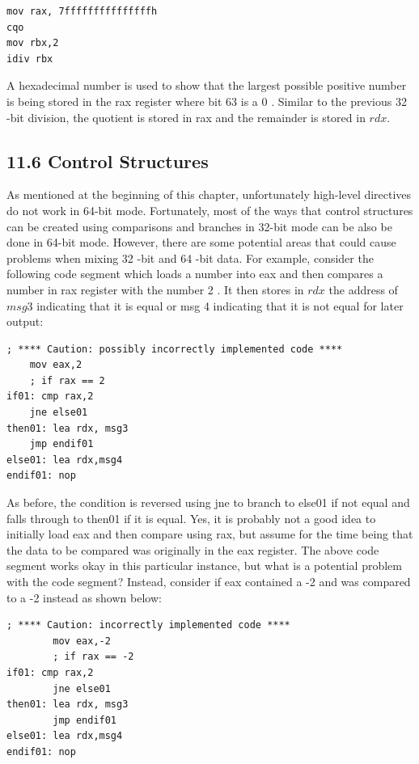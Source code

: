 \documentclass[10pt]{book}
\begin{document}
\begin{verbatim}
mov rax, 7fffffffffffffffh
cqo
mov rbx,2
idiv rbx
\end{verbatim}

A hexadecimal number is used to show that the largest possible positive number is being stored in the rax register where bit 63 is a 0 . Similar to the previous 32 -bit division, the quotient is stored in rax and the remainder is stored in $r d x$.

\subsection*{11.6 Control Structures}
As mentioned at the beginning of this chapter, unfortunately high-level directives do not work in 64-bit mode. Fortunately, most of the ways that control structures can be created using comparisons and branches in 32-bit mode can be also be done in 64-bit mode. However, there are some potential areas that could cause problems when mixing 32 -bit and 64 -bit data. For example, consider the following code segment which loads a number into eax and then compares a number in rax register with the number 2 . It then stores in $r d x$ the address of $m s g 3$ indicating that it is equal or msg 4 indicating that it is not equal for later output:

\begin{verbatim}
; **** Caution: possibly incorrectly implemented code ****
    mov eax,2
    ; if rax == 2
if01: cmp rax,2
    jne else01
then01: lea rdx, msg3
    jmp endif01
else01: lea rdx,msg4
endif01: nop
\end{verbatim}

As before, the condition is reversed using jne to branch to else01 if not equal and falls through to then01 if it is equal. Yes, it is probably not a good idea to initially load eax and then compare using rax, but assume for the time being that the data to be compared was originally in the eax register. The above code segment works okay in this particular instance, but what is a potential problem with the code segment? Instead, consider if eax contained a -2 and was compared to a -2 instead as shown below:

\begin{verbatim}
; **** Caution: incorrectly implemented code ****
        mov eax,-2
        ; if rax == -2
if01: cmp rax,2
        jne else01
then01: lea rdx, msg3
        jmp endif01
else01: lea rdx,msg4
endif01: nop
\end{verbatim}
\end{document}
